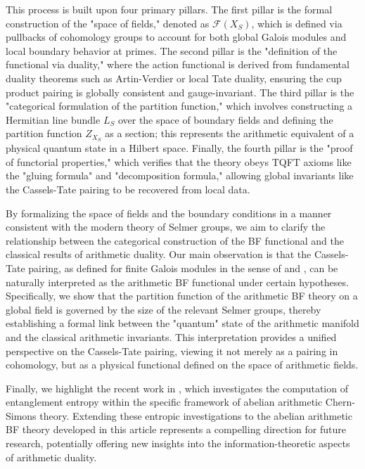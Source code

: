 \documentclass[a4paper]{amsart}
\theoremstyle{definition}
\numberwithin{equation}{section}
\begin{document}
This process is built upon four primary pillars. 
The first pillar is the formal construction of the "space of fields," denoted as $\mathscr{F}(X_S)$, which is defined via pullbacks of cohomology groups to account for both global Galois modules and local boundary behavior at primes. 
The second pillar is the "definition of the functional via duality," where the action functional is derived from fundamental duality theorems such as Artin-Verdier or local Tate duality, ensuring the cup product pairing is globally consistent and gauge-invariant. 
The third pillar is the "categorical formulation of the partition function," which involves constructing a Hermitian line bundle $L_S$ over the space of boundary fields and defining the partition function $Z_{X_S}$ as a section; this represents the arithmetic equivalent of a physical quantum state in a Hilbert space. 
Finally, the fourth pillar is the "proof of functorial properties," which verifies that the theory obeys TQFT axioms like the "gluing formula" and "decomposition formula," allowing global invariants like the Cassels-Tate pairing to be recovered from local data.

By formalizing the space of fields and the boundary conditions in a manner consistent with the modern theory of Selmer groups, we aim to clarify the relationship between the categorical construction of the BF functional and the classical results of arithmetic duality. 
Our main observation is that the Cassels-Tate pairing, as defined for finite Galois modules in the sense of \cite{MS21} and \cite{MS24}, can be naturally interpreted as the arithmetic BF functional under certain hypotheses. 
Specifically, we show that the partition function of the arithmetic BF theory on a global field is governed by the size of the relevant Selmer groups, thereby establishing a formal link between the "quantum" state of the arithmetic manifold and the classical arithmetic invariants. This interpretation provides a unified perspective on the Cassels-Tate pairing, viewing it not merely as a pairing in cohomology, but as a physical functional defined on the space of arithmetic fields. 

Finally, we highlight the recent work in \cite{CKKPY24}, which investigates the computation of entanglement entropy within the specific framework of abelian arithmetic Chern-Simons theory. Extending these entropic investigations to the abelian arithmetic BF theory developed in this article represents a compelling direction for future research, potentially offering new insights into the information-theoretic aspects of arithmetic duality.
\end{document}
